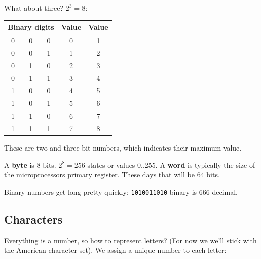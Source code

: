 \documentclass[titlepage]{tufte-book}
\begin{document}
\begin{fullwidth}
What about three? $2^3 = 8$:

\begin{center}
\begin{tabular}{|ccc|c|c|}
\hline
\multicolumn{3}{|c|}{Binary digits} & Value & Value \\
\hline
0 & 0 & 0 & 0 & 1\\
0 & 0 & 1 & 1 & 2\\
0 & 1 & 0 & 2 & 3\\
0 & 1 & 1 & 3 & 4\\
1 & 0 & 0 & 4 & 5\\
1 & 0 & 1 & 5 & 6\\
1 & 1 & 0 & 6 & 7\\
1 & 1 & 1 & 7 & 8\\
\hline
\end{tabular}
\end{center}

These are two and three bit numbers, which indicates their maximum value.

A {\bf byte} is 8 bits. $2^8 = 256$ states or values 0..255.  A {\bf word} is typically the size of the microprocessors primary register. These days that will be 64 bits.

Binary numbers get long pretty quickly: {\tt 1010011010} binary is 666 decimal.

\subsection{Characters}

Everything is a number, so how to represent letters? (For now we we'll stick with the American character set). We assign a unique number to each letter:


\end{fullwidth}
\end{document}
